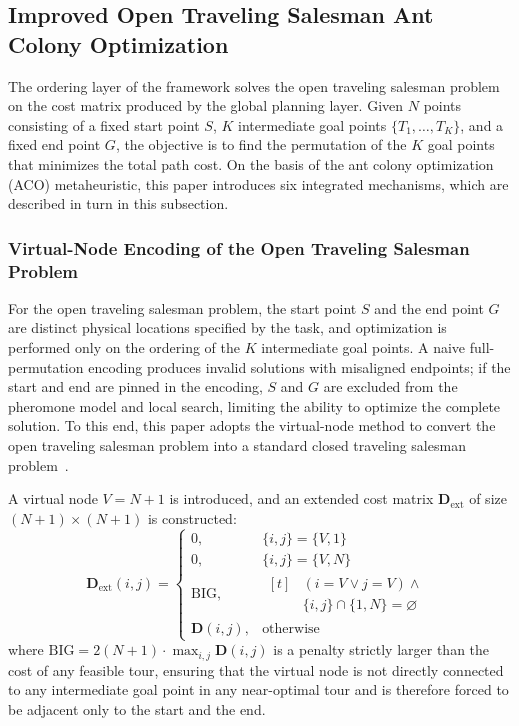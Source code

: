 \subsection{Improved Open Traveling Salesman Ant Colony Optimization}
\label{subsec:aco}

The ordering layer of the framework solves the open traveling salesman problem on the cost matrix produced by the global planning layer. Given $N$ points consisting of a fixed start point $S$, $K$ intermediate goal points $\{T_1, \dots, T_K\}$, and a fixed end point $G$, the objective is to find the permutation of the $K$ goal points that minimizes the total path cost. On the basis of the ant colony optimization (ACO) metaheuristic, this paper introduces six integrated mechanisms, which are described in turn in this subsection.

\subsubsection{Virtual-Node Encoding of the Open Traveling Salesman Problem}
\label{subsec:virtual}

For the open traveling salesman problem, the start point $S$ and the end point $G$ are distinct physical locations specified by the task, and optimization is performed only on the ordering of the $K$ intermediate goal points. A naive full-permutation encoding produces invalid solutions with misaligned endpoints; if the start and end are pinned in the encoding, $S$ and $G$ are excluded from the pheromone model and local search, limiting the ability to optimize the complete solution. To this end, this paper adopts the virtual-node method to convert the open traveling salesman problem into a standard closed traveling salesman problem~\textcolor{blue}{\cite{ref32}}.

A virtual node $V = N + 1$ is introduced, and an extended cost matrix $\mathbf{D}_{\mathrm{ext}}$ of size $(N+1) \times (N+1)$ is constructed:
\begin{equation}
\mathbf{D}_{\mathrm{ext}}(i, j) =
\begin{cases}
0, & \{i, j\} = \{V, 1\} \\
0, & \{i, j\} = \{V, N\} \\
\mathrm{BIG}, & \begin{aligned}[t]
& (i = V \lor j = V) \land \\
& \{i, j\} \cap \{1, N\} = \varnothing
\end{aligned} \\
\mathbf{D}(i, j), & \text{otherwise}
\end{cases}
\label{eq:dext}
\end{equation}
where $\mathrm{BIG} = 2(N+1) \cdot \max_{i,j} \mathbf{D}(i,j)$ is a penalty strictly larger than the cost of any feasible tour, ensuring that the virtual node is not directly connected to any intermediate goal point in any near-optimal tour and is therefore forced to be adjacent only to the start and the end.

